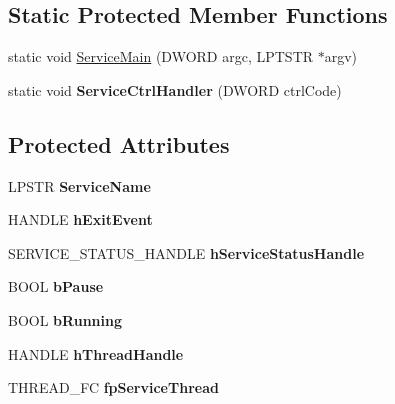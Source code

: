 \subsection*{Static Protected Member Functions}
\begin{DoxyCompactItemize}
\item 
static void \mbox{\hyperlink{classNTService_a8b34dc5c32e42c3ec151e82f7a25474a}{Service\+Main}} (D\+W\+O\+RD argc, L\+P\+T\+S\+TR $\ast$argv)
\item 
\mbox{\label{classNTService_ae99a1f09451dc326977b20205dae3932}} 
static void {\bfseries Service\+Ctrl\+Handler} (D\+W\+O\+RD ctrl\+Code)
\end{DoxyCompactItemize}
\subsection*{Protected Attributes}
\begin{DoxyCompactItemize}
\item 
\mbox{\label{classNTService_aba2f195dc0591ca76755f92afedc9325}} 
L\+P\+S\+TR {\bfseries Service\+Name}
\item 
\mbox{\label{classNTService_a2e40d90a098bfb43fcd2515561a61fb2}} 
H\+A\+N\+D\+LE {\bfseries h\+Exit\+Event}
\item 
\mbox{\label{classNTService_a722b687dccaf27d5e92a9803ea2b27fb}} 
S\+E\+R\+V\+I\+C\+E\+\_\+\+S\+T\+A\+T\+U\+S\+\_\+\+H\+A\+N\+D\+LE {\bfseries h\+Service\+Status\+Handle}
\item 
\mbox{\label{classNTService_acff3fd34d4a08ab3c72f9359544cbed8}} 
B\+O\+OL {\bfseries b\+Pause}
\item 
\mbox{\label{classNTService_a6ec6c8992bf31c6f39caacce8ac4657e}} 
B\+O\+OL {\bfseries b\+Running}
\item 
\mbox{\label{classNTService_abe58a7c918e005800b549f2f6fa68e7a}} 
H\+A\+N\+D\+LE {\bfseries h\+Thread\+Handle}
\item 
\mbox{\label{classNTService_a2ae0f6d830e677113594670c20fd9c06}} 
T\+H\+R\+E\+A\+D\+\_\+\+FC {\bfseries fp\+Service\+Thread}
\end{DoxyCompactItemize}


